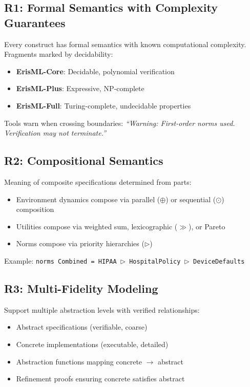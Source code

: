 \documentclass[conference]{IEEEtran}
\begin{document}
\subsection{R1: Formal Semantics with Complexity Guarantees}

Every construct has formal semantics with known computational
complexity. Fragments marked by decidability:
\begin{itemize}
\item \textbf{ErisML-Core}: Decidable, polynomial verification
\item \textbf{ErisML-Plus}: Expressive, NP-complete
\item \textbf{ErisML-Full}: Turing-complete, undecidable properties
\end{itemize}

Tools warn when crossing boundaries: \emph{``Warning: First-order norms
used. Verification may not terminate.''}

\subsection{R2: Compositional Semantics}

Meaning of composite specifications determined from parts:
\begin{itemize}
\item Environment dynamics compose via parallel ($\oplus$) or sequential ($\odot$) composition
\item Utilities compose via weighted sum, lexicographic ($\gg$), or Pareto
\item Norms compose via priority hierarchies ($\rhd$)
\end{itemize}

Example:
\texttt{norms Combined = HIPAA $\rhd$ HospitalPolicy $\rhd$ DeviceDefaults}

\subsection{R3: Multi-Fidelity Modeling}

Support multiple abstraction levels with verified relationships:
\begin{itemize}
\item Abstract specifications (verifiable, coarse)
\item Concrete implementations (executable, detailed)
\item Abstraction functions mapping concrete $\to$ abstract
\item Refinement proofs ensuring concrete satisfies abstract
\end{itemize}
\end{document}
